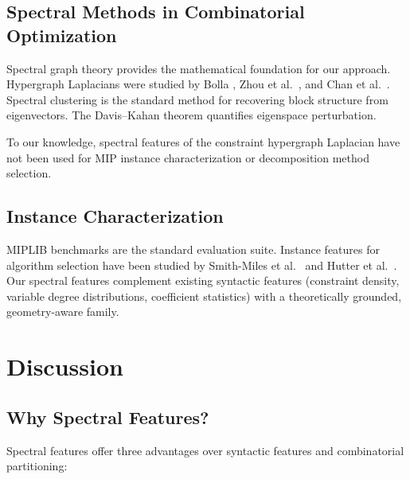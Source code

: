 \documentclass[12pt]{article}
\begin{document}
\subsection{Spectral Methods in Combinatorial Optimization}

Spectral graph theory \citep{chung1997spectral,spielman2012spectral}
provides the mathematical foundation for our approach.  Hypergraph
Laplacians were studied by Bolla \citep{bolla1993spectra}, Zhou et al.\
\citep{zhou2006learning}, and Chan et al.\ \citep{chan2018spectral}.
Spectral clustering \citep{ng2001spectral,von2007tutorial} is the standard
method for recovering block structure from eigenvectors.  The Davis--Kahan
theorem \citep{davis1970rotation,stewart1990matrix} quantifies eigenspace
perturbation.

To our knowledge, spectral features of the constraint hypergraph Laplacian
have not been used for MIP instance characterization or decomposition
method selection.

\subsection{Instance Characterization}

MIPLIB benchmarks \citep{koch2011miplib,gleixner2021miplib} are the
standard evaluation suite.  Instance features for algorithm selection have
been studied by Smith-Miles et al.\ \citep{smith2014measuring} and Hutter
et al.\ \citep{hutter2014algorithm}.  Our spectral features complement
existing syntactic features (constraint density, variable degree
distributions, coefficient statistics) with a theoretically grounded,
geometry-aware family.

\section{Discussion}
\label{sec:discussion}

\subsection{Why Spectral Features?}

Spectral features offer three advantages over syntactic features and
combinatorial partitioning:
\end{document}
